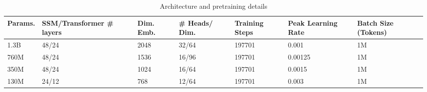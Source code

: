 \begin{table}[h]  
\small
    \centering  
    \caption{Architecture and pretraining details}  
    \label{tab:pretraining-details}  
    \begin{tabular}{l l l l l l l}  
        Params. & SSM/Transformer \# layers & Dim. Emb. & \# Heads/ Dim. & Training Steps & Peak Learning Rate & Batch Size (Tokens) \\
        \hline  
        1.3B & 48/24 & 2048 & 32/64 & 197701 &  0.001 & 1M \\  
        760M & 48/24 & 1536 & 16/96 & 197701 & 0.00125& 1M  \\  
        350M & 48/24 & 1024 & 16/64 & 197701 & 0.0015 & 1M \\  
        130M & 24/12 & 768 & 12/64 & 197701 & 0.003 & 1M \\  
    \end{tabular} 
    \label{tab:architecture-detail}
\end{table}
